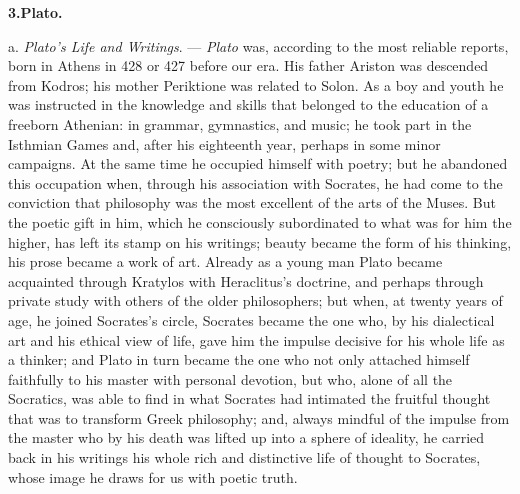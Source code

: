 \divrule

\begin{center}
\textbf{3.\enspace Plato.}
\end{center}

a. \emph{Plato's Life and Writings}. --- \emph{Plato} was, according to the
most reliable reports, born in Athens in 428 or 427 before our era. His
father Ariston was descended from Kodros; his mother Periktione was related
to Solon. As a boy and youth he was instructed in the knowledge and skills
that belonged to the education of a freeborn Athenian: in grammar,
gymnastics, and music; he took part in the Isthmian Games and, after his
eighteenth year, perhaps in some minor campaigns. At the same time he
occupied himself with poetry; but he abandoned this occupation when,
through his association with Socrates, he had come to the conviction that
philosophy was the most excellent of the arts of the Muses. But the poetic
gift in him, which he consciously subordinated to what was for him the
higher, has left its stamp on his writings; beauty became the form of his
thinking, his prose became a work of art. Already as a young man Plato
became acquainted through Kratylos with Heraclitus's doctrine, and perhaps
through private study with others of the older philosophers; but when, at
twenty years of age, he joined Socrates's circle, Socrates became the one
who, by his dialectical art and his ethical view of life, gave him the
impulse decisive for his whole life as a thinker; and Plato in turn became
the one who not only attached himself faithfully to his master with
personal devotion, but who, alone of all the Socratics, was able to find in
what Socrates had intimated the fruitful thought that was to transform
Greek philosophy; and, always mindful of the impulse from the master who by
his death was lifted up into a sphere of ideality, he carried back in his
writings his whole rich and distinctive life of thought to Socrates, whose
image he draws for us with poetic truth.


